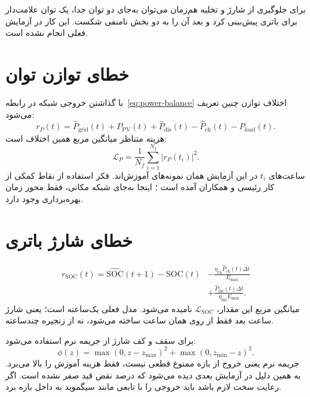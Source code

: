 برای جلوگیری از شارژ و تخلیه هم‌زمان می‌توان به‌جای دو توان جدا، یک توان علامت‌دار برای باتری پیش‌بینی کرد و بعد آن را به دو بخش نامنفی شکست. این کار در آزمایش فعلی انجام نشده است.

\section{خطای توازن توان}
با گذاشتن خروجی شبکه در رابطه~\eqref{eq:power-balance} اختلاف توازن چنین تعریف می‌شود:
\begin{equation}
  r_{P}(t)=\hat{P}_{\mathrm{grid}}(t)+P_{\mathrm{PV}}(t)
  +\hat{P}_{\mathrm{dis}}(t)-\hat{P}_{\mathrm{ch}}(t)
  -P_{\mathrm{load}}(t).
  \label{eq:power-residual}
\end{equation}
هزینه متناظر میانگین مربع همین اختلاف است:
\begin{equation}
  \mathcal{L}_{P}=\frac{1}{N_f}\sum_{i=1}^{N_f}
  \left|r_P(t_i)\right|^2.
  \label{eq:power-loss}
\end{equation}
ساعت‌های $t_i$ در این آزمایش همان نمونه‌های آموزش‌اند. فکر استفاده از نقاط کمکی از کار رئیسی و همکاران آمده است ؛ اینجا به‌جای شبکه مکانی، فقط محور زمان بهره‌برداری وجود دارد.

\section{خطای شارژ باتری}
\begin{equation}
\begin{split}
  r_{\mathrm{SOC}}(t)=\widehat{\mathrm{SOC}}(t+1)-\mathrm{SOC}(t)
  &-\frac{\eta_{\mathrm{ch}}\hat{P}_{\mathrm{ch}}(t)\Delta t}{E_{\max}}\\
  &+\frac{\hat{P}_{\mathrm{dis}}(t)\Delta t}
  {\eta_{\mathrm{dis}}E_{\max}}.
\end{split}
\label{eq:soc-residual}
\end{equation}
میانگین مربع این مقدار، $\mathcal{L}_{\mathrm{SOC}}$ نامیده می‌شود. مدل فعلی یک‌ساعته است؛ یعنی شارژ ساعت بعد فقط از روی همان ساعت ساخته می‌شود، نه از زنجیره چندساعته.

برای سقف و کف شارژ از جریمه نرم استفاده می‌شود:
\begin{equation}
  \phi(z)=\max(0,z-z_{\max})^2+\max(0,z_{\min}-z)^2.
  \label{eq:bound-penalty}
\end{equation}
جریمه نرم یعنی خروج از بازه ممنوع قطعی نیست، فقط هزینه آموزش را بالا می‌برد. به همین دلیل در آزمایش بعدی دیده می‌شود که درصد نقض قید صفر نشده است. اگر رعایت سخت لازم باشد باید خروجی را با تابعی مانند سیگموید به داخل بازه برد.

